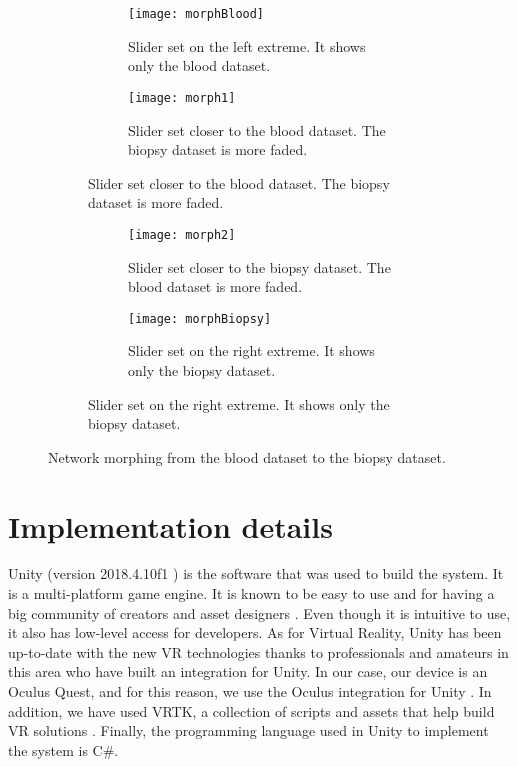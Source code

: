 \begin{figure}[h!]
    \centering
    \begin{subfigure}{\textwidth}
      \begin{subfigure}[t]{0.5\textwidth}
          \centering
          \texttt{[image: morphBlood]}
          \caption{Slider set on the left extreme. It shows only the blood dataset.}
          \label{fig:morphBlood}
      \end{subfigure}
      \begin{subfigure}[t]{0.5\textwidth}
          \centering
          \texttt{[image: morph1]}
          \caption{Slider set closer to the blood dataset. The biopsy dataset is more faded.}
          \label{fig:morph1}
      \end{subfigure}
    \end{subfigure}

    \begin{subfigure}{\textwidth}
      \begin{subfigure}[t]{0.5\textwidth}
          \centering
          \texttt{[image: morph2]}
          \caption{Slider set closer to the biopsy dataset. The blood dataset is more faded.}
          \label{fig:morph2}
      \end{subfigure}
      \begin{subfigure}[t]{0.5\textwidth}
          \centering
          \texttt{[image: morphBiopsy]}
          \caption{Slider set on the right extreme. It shows only the biopsy dataset.}
          \label{fig:morphbiopsy}
      \end{subfigure}
    \end{subfigure}

    \caption{Network morphing from the blood dataset to the biopsy dataset.}
    \label{fig:morphing}
\end{figure}

\section{Implementation details}
Unity (version 2018.4.10f1 \cite{unity2018}) is the software that was used to build the system. It is a multi-platform game engine. It is known to be easy to use and for having a big community of creators and asset designers \cite{developing_vr_unity}. Even though it is intuitive to use, it also has low-level access for developers. As for Virtual Reality, Unity has been up-to-date with the new VR technologies thanks to professionals and amateurs in this area who have built an integration for Unity. In our case, our device is an Oculus Quest, and for this reason, we use the Oculus integration for Unity \cite{oculus_unity_integration}. In addition, we have used VRTK, a collection of scripts and assets that help build VR solutions \cite{vrtk_what}. Finally, the programming language used in Unity to implement the system is C\#.


